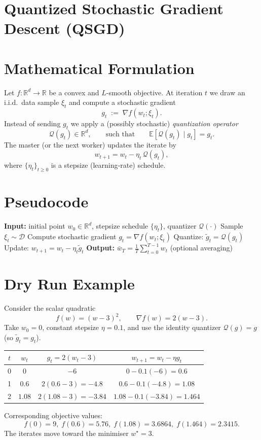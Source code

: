 \documentclass{article}
\newcommand{\E}{\mathbb{E}}
\newcommand{\R}{\mathbb{R}}
\newcommand{\Q}{\mathcal{Q}}
\begin{document}
\section*{Quantized Stochastic Gradient Descent (QSGD)}

\section*{Mathematical Formulation}
Let $f:\R^d\to\R$ be a convex and $L$-smooth objective.  
At iteration $t$ we draw an i.i.d.\ data sample $\xi_t$ and compute a stochastic gradient 
\[
g_t \;:=\; \nabla f(w_t;\xi_t).
\]
Instead of sending $g_t$ we apply a (possibly stochastic) \emph{quantization operator}
\[
\Q(g_t)\in\R^d,\qquad\text{such that}\qquad \E[\Q(g_t)\mid g_t]=g_t .
\]
The master (or the next worker) updates the iterate by
\begin{equation}\label{eq:update}
w_{t+1}=w_t-\eta_t\,\Q(g_t),
\end{equation}
where $\{\eta_t\}_{t\ge 0}$ is a stepsize (learning‑rate) schedule.

\section*{Pseudocode}
\begin{algorithm}[H]
\caption{Quantized Stochastic Gradient Descent (QSGD)}
\begin{algorithmic}[1]
\STATE \textbf{Input:} initial point $w_0\in\R^d$, stepsize schedule $\{\eta_t\}$, quantizer $\Q(\cdot)$
    \STATE Sample $\xi_t\sim\mathcal{D}$  \hfill{}
    \STATE Compute stochastic gradient $g_t = \nabla f(w_t;\xi_t)$
    \STATE Quantize: $\tilde g_t = \Q(g_t)$
    \STATE Update: $w_{t+1}= w_t-\eta_t \tilde g_t$ \hfill{}
\ENDFOR
\STATE \textbf{Output:} $\bar w_T = \frac1T\sum_{t=0}^{T-1} w_t$ (optional averaging)
\end{algorithmic}
\end{algorithm}

\section*{Dry Run Example}
Consider the scalar quadratic
\[
f(w)= (w-3)^2, \qquad \nabla f(w)=2(w-3).
\]
Take $w_0=0$, constant stepsize $\eta=0.1$, and use the identity quantizer $\Q(g)=g$ (so $\tilde g_t=g_t$).  

\begin{center}
\begin{tabular}{c|c|c|c}
$t$ & $w_t$ & $g_t=2(w_t-3)$ & $w_{t+1}=w_t-\eta g_t$ \\ \hline
0 & $0$ & $-6$ & $0-0.1(-6)=0.6$ \\
1 & $0.6$ & $2(0.6-3)=-4.8$ & $0.6-0.1(-4.8)=1.08$ \\
2 & $1.08$ & $2(1.08-3)=-3.84$ & $1.08-0.1(-3.84)=1.464$ \\
\end{tabular}
\end{center}
Corresponding objective values:
\[
f(0)=9,\; f(0.6)=5.76,\; f(1.08)=3.6864,\; f(1.464)=2.3415.
\]
The iterates move toward the minimiser $w^\star=3$.
\end{document}
